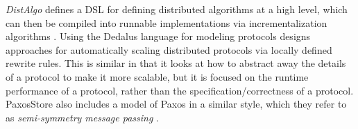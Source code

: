 \documentclass[acmsmall,screen,review]{acmart}
\begin{document}
\textit{DistAlgo} defines a DSL for defining distributed algorithms at a high level, which can then be compiled into runnable implementations via incrementalization algorithms \cite{2017claritydistalgo}. Using the Dedalus language for modeling protocols \cite{2024optprotrewrites} designs approaches for automatically scaling distributed protocols via locally defined rewrite rules. This is similar in that it looks at how to abstract away the details of a protocol to make it more scalable, but it is focused on the runtime performance of a protocol, rather than the specification/correctness of a protocol. PaxosStore also includes a model of Paxos in a similar style, which they refer to as \textit{semi-symmetry message passing} \cite{2017paxosstore}.




\end{document}
